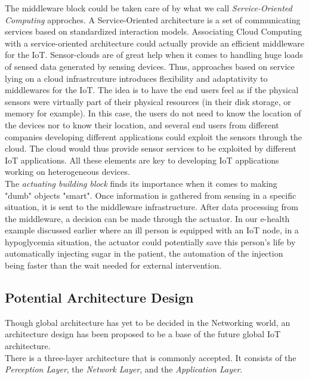 The middleware block could be taken care of by what we call \textit{Service-Oriented Computing} approches. A Service-Oriented architecture is a set of communicating services based on standardized interaction models. Associating Cloud Computing with a service-oriented architecture could actually provide an efficient middleware for the IoT. Sensor-clouds are of great help when it comes to handling huge loads of sensed data generated by sensing devices. Thus, approaches based on service lying on a cloud infrastrcuture introduces flexibility and adaptativity to middlewares for the IoT. The idea is to have the end users feel as if the physical sensors were virtually part of their physical resources (in their disk storage, or memory for example). In this case, the users do not need to know the location of the devices nor to know their location, and several end users from different companies developing different applications could exploit the sensors through the cloud. The cloud would thus provide sensor services to be exploited by different IoT applications. All these elements are key to developing IoT applications working on heterogeneous devices. \\

The \textit{actuating building block} finds its importance when it comes to making "dumb" objects "smart". Once information is gathered from sensing in a specific situation, it is sent to the middleware infrastructure. After data processing from the middleware, a decision can be made through the actuator. In our e-health example discussed earlier where an ill person is equipped with an IoT node, in a hypoglycemia situation, the actuator could potentially save this person's life by automatically injecting sugar in the patient, the automation of the injection being faster than the wait needed for external intervention. \\

\subsection{Potential Architecture Design}

Though global architecture has yet to be decided in the Networking world, an architecture design has been proposed to be a base of the future global IoT architecture. \\

There is a three-layer architecture that is commonly accepted. It consists of the \textit{Perception Layer}, the \textit{Network Layer}, and the \textit{Application Layer}. \\

